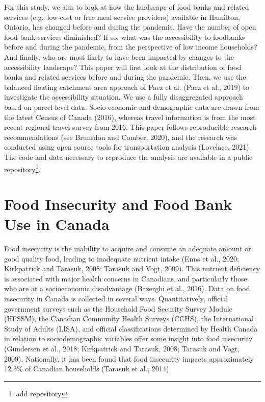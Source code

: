 \documentclass[]{elsarticle} %
\begin{document}
For this study, we aim to look at how the landscape of food banks and
related services (e.g.~low-cost or free meal service providers)
available in Hamilton, Ontario, has changed before and during the
pandemic. Have the number of open food bank services diminished? If so,
what was the accessibility to foodbanks before and during the pandemic,
from the perspective of low income households? And finally, who are most
likely to have been impacted by changes to the accessibility landscape?
This paper will first look at the distribution of food banks and related
services before and during the pandemic. Then, we use the balanced
floating catchment area approach of Paez et al. (Paez et al., 2019) to
investigate the accessibility situation. We use a fully disaggregated
approach based on parcel-level data. Socio-economic and demographic data
are drawn from the latest Census of Canada (2016), whereas travel
information is from the most recent regional travel survey from 2016.
This paper follows reproducible research recommendations (see Brunsdon
and Comber, 2020), and the research was conducted using open source
tools for transportation analysis (Lovelace, 2021). The code and data
necessary to reproduce the analysis are available in a public
repository\footnote{add repository}.

\hypertarget{food-insecurity-and-food-bank-use-in-canada}{%
\section{Food Insecurity and Food Bank Use in
Canada}\label{food-insecurity-and-food-bank-use-in-canada}}

Food insecurity is the inability to acquire and consume an adequate
amount or good quality food, leading to inadequate nutrient intake (Enns
et al., 2020; Kirkpatrick and Tarasuk, 2008; Tarasuk and Vogt, 2009).
This nutrient deficiency is associated with major health concerns in
Canadians, and particularly those who are at a socioeconomic
disadvantage (Bazerghi et al., 2016). Data on food insecurity in Canada
is collected in several ways. Quantitatively, official government
surveys such as the Household Food Security Survey Module (HFSSM), the
Canadian Community Health Surveys (CCHS), the International Study of
Adults (LISA), and official classifications determined by Health Canada
in relation to sociodemographic variables offer some insight into food
insecurity (Gundersen et al., 2018; Kirkpatrick and Tarasuk, 2008;
Tarasuk and Vogt, 2009). Nationally, it has been found that food
insecurity impacts approximately 12.3\% of Canadian households (Tarasuk
et al., 2014)
\end{document}
